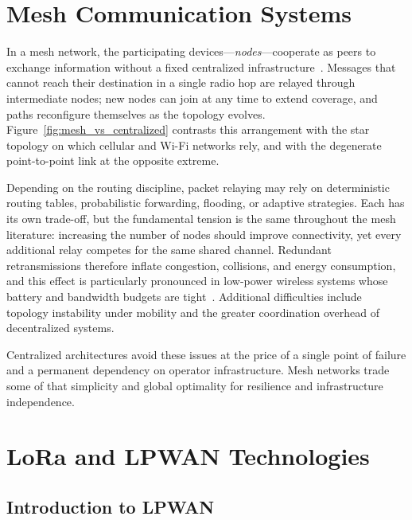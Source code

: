 \documentclass[english,bachelor]{tfgitic}[2026/01/22]
\begin{document}
\section{Mesh Communication Systems}
\label{sec:mesh}

In a mesh network, the participating devices---\emph{nodes}---cooperate as peers to exchange information without a fixed centralized infrastructure~\cite{mesh_survey,ad_hoc_networks}. Messages that cannot reach their destination in a single radio hop are relayed through intermediate nodes; new nodes can join at any time to extend coverage, and paths reconfigure themselves as the topology evolves. Figure~\ref{fig:mesh_vs_centralized} contrasts this arrangement with the star topology on which cellular and Wi-Fi networks rely, and with the degenerate point-to-point link at the opposite extreme.

Depending on the routing discipline, packet relaying may rely on deterministic routing tables, probabilistic forwarding, flooding, or adaptive strategies. Each has its own trade-off, but the fundamental tension is the same throughout the mesh literature: increasing the number of nodes should improve connectivity, yet every additional relay competes for the same shared channel. Redundant retransmissions therefore inflate congestion, collisions, and energy consumption, and this effect is particularly pronounced in low-power wireless systems whose battery and bandwidth budgets are tight~\cite{ad_hoc_networks}. Additional difficulties include topology instability under mobility and the greater coordination overhead of decentralized systems.

Centralized architectures avoid these issues at the price of a single point of failure and a permanent dependency on operator infrastructure. Mesh networks trade some of that simplicity and global optimality for resilience and infrastructure independence.


\newpage
\section{LoRa and LPWAN Technologies}
\label{sec:lora-lpwan}

\subsection{Introduction to LPWAN}
\end{document}
